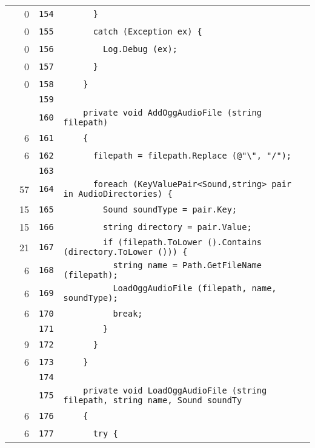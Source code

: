 \documentclass[a4paper,10pt]{article}
\begin{document}
\begin{longtable}[l]{lrrl}
\cellcolor{red} & 0 & \verb~154~ & \verb~      }~\\
\cellcolor{red} & 0 & \verb~155~ & \verb~      catch (Exception ex) {~\\
\cellcolor{red} & 0 & \verb~156~ & \verb~        Log.Debug (ex);~\\
\cellcolor{red} & 0 & \verb~157~ & \verb~      }~\\
\cellcolor{red} & 0 & \verb~158~ & \verb~    }~\\
\cellcolor{gray} &  & \verb~159~ & \verb~~\\
\cellcolor{gray} &  & \verb~160~ & \verb~    private void AddOggAudioFile (string filepath)~\\
\cellcolor{green} & 6 & \verb~161~ & \verb~    {~\\
\cellcolor{green} & 6 & \verb~162~ & \verb~      filepath = filepath.Replace (@"\", "/");~\\
\cellcolor{gray} &  & \verb~163~ & \verb~~\\
\cellcolor{green} & 57 & \verb~164~ & \verb~      foreach (KeyValuePair<Sound,string> pair in AudioDirectories) {~\\
\cellcolor{green} & 15 & \verb~165~ & \verb~        Sound soundType = pair.Key;~\\
\cellcolor{green} & 15 & \verb~166~ & \verb~        string directory = pair.Value;~\\
\cellcolor{green} & 21 & \verb~167~ & \verb~        if (filepath.ToLower ().Contains (directory.ToLower ())) {~\\
\cellcolor{green} & 6 & \verb~168~ & \verb~          string name = Path.GetFileName (filepath);~\\
\cellcolor{green} & 6 & \verb~169~ & \verb~          LoadOggAudioFile (filepath, name, soundType);~\\
\cellcolor{green} & 6 & \verb~170~ & \verb~          break;~\\
\cellcolor{gray} &  & \verb~171~ & \verb~        }~\\
\cellcolor{green} & 9 & \verb~172~ & \verb~      }~\\
\cellcolor{green} & 6 & \verb~173~ & \verb~    }~\\
\cellcolor{gray} &  & \verb~174~ & \verb~~\\
\cellcolor{gray} &  & \verb~175~ & \verb~    private void LoadOggAudioFile (string filepath, string name, Sound soundTy~\\
\cellcolor{green} & 6 & \verb~176~ & \verb~    {~\\
\cellcolor{green} & 6 & \verb~177~ & \verb~      try {~\\

\end{longtable}
\end{document}
